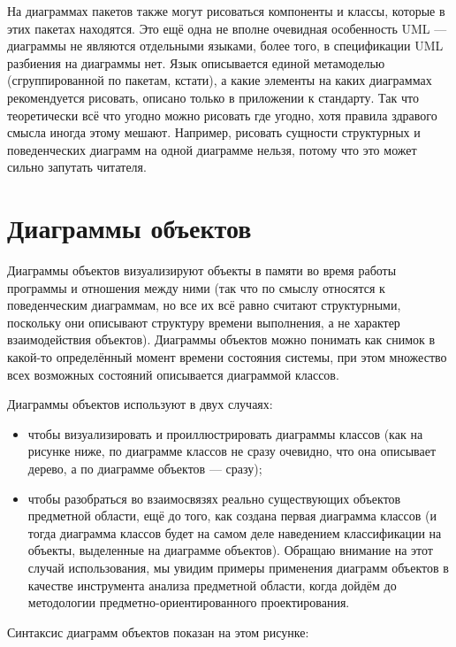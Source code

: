 \documentclass[a5paper]{article}
\begin{document}
На диаграммах пакетов также могут рисоваться компоненты и классы, которые в этих пакетах находятся. Это ещё одна не вполне очевидная особенность UML --- диаграммы не являются отдельными языками, более того, в спецификации UML разбиения на диаграммы нет. Язык описывается единой метамоделью (сгруппированной по пакетам, кстати), а какие элементы на каких диаграммах рекомендуется рисовать, описано только в приложении к стандарту. Так что теоретически всё что угодно можно рисовать где угодно, хотя правила здравого смысла иногда этому мешают. Например, рисовать сущности структурных и поведенческих диаграмм на одной диаграмме нельзя, потому что это может сильно запутать читателя.

\section{Диаграммы объектов}

Диаграммы объектов визуализируют объекты в памяти во время работы программы и отношения между ними (так что по смыслу относятся к поведенческим диаграммам, но все их всё равно считают структурными, поскольку они описывают структуру времени выполнения, а не характер взаимодействия объектов). Диаграммы объектов можно понимать как снимок в какой-то определённый момент времени состояния системы, при этом множество всех возможных состояний описывается диаграммой классов.

Диаграммы объектов используют в двух случаях:

\begin{itemize}
	\item чтобы визуализировать и проиллюстрировать диаграммы классов (как на рисунке ниже, по диаграмме классов не сразу очевидно, что она описывает дерево, а по диаграмме объектов --- сразу);
	\item чтобы разобраться во взаимосвязях реально существующих объектов предметной области, ещё до того, как создана первая диаграмма классов (и тогда диаграмма классов будет на самом деле наведением классификации на объекты, выделенные на диаграмме объектов). Обращаю внимание на этот случай использования, мы увидим примеры применения диаграмм объектов в качестве инструмента анализа предметной области, когда дойдём до методологии предметно-ориентированного проектирования.
\end{itemize}

Синтаксис диаграмм объектов показан на этом рисунке:
\end{document}

